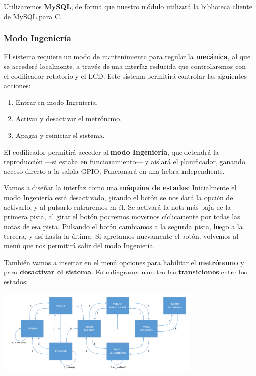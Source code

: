 \documentclass[10pt,a4paper]{article}
\begin{document}
	Utilizaremos \textbf{MySQL}, de forma que nuestro módulo utilizará la biblioteca cliente de MySQL para C.
	
	\subsubsection*{Modo Ingeniería}
	
	El sistema requiere un modo de mantenimiento para regular la \textbf{mecánica}, al que se accederá localmente, a través de una interfaz reducida que controlaremos con el codificador rotatorio y el LCD. Este sistema permitirá controlar las siguientes acciones:
	
	\begin{enumerate}
		\item Entrar en modo Ingeniería.
		\item Activar y desactivar el metrónomo.
		\item Apagar y reiniciar el sistema.
	\end{enumerate}
	
	El codificador permitirá acceder al \textbf{modo Ingeniería}, que detendrá la reproducción ---si estaba en funcionamiento--- y  aislará el planificador, ganando acceso directo a la salida GPIO. Funcionará en una hebra independiente.
	
	Vamos a diseñar la interfaz como una \textbf{máquina de estados}: Inicialmente el modo Ingeniería está desactivado, girando el botón se nos dará la opción de activarlo, y al pulsarlo entraremos en él. Se activará la nota más baja de la primera pista, al girar el botón podremos movernos cíclicamente por todas las notas de esa pista. Pulsando el botón cambiamos a la segunda pista, luego a la tercera, y así hasta la última. Si apretamos nuevamente el botón, volvemos al menú que nos permitirá salir del modo Ingeniería.
	
	También vamos a insertar en el menú opciones para habilitar el \textbf{metrónomo} y para \textbf{desactivar el sistema}. Este diagrama muestra las \textbf{transiciones} entre los estados:
	
	\begin{center}
		\includegraphics[width=0.75\textwidth]{images/engineer} 
	\end{center}
	
\end{document}
